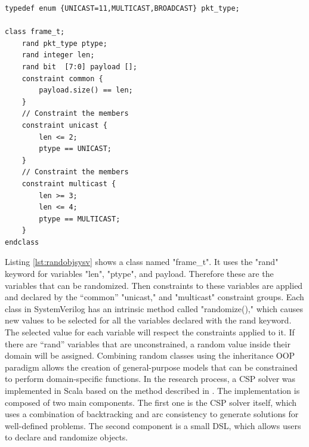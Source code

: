 \documentclass[conference]{IEEEtran}
\begin{document}
\begin{lstlisting}[caption={Random object in SystemVerilog}, label={lst:randobjsysv}]
typedef enum {UNICAST=11,MULTICAST,BROADCAST} pkt_type;

class frame_t;
    rand pkt_type ptype;
    rand integer len;
    rand bit  [7:0] payload [];
    constraint common {
        payload.size() == len;
    }
    // Constraint the members
    constraint unicast {
        len <= 2;
        ptype == UNICAST;
    }
    // Constraint the members
    constraint multicast {
        len >= 3;
        len <= 4;
        ptype == MULTICAST;
    }
endclass
\end{lstlisting}
Listing \ref{lst:randobjsysv} shows a class named "frame\_t". It uses the "rand" keyword for variables "len", "ptype", and payload.
Therefore these are the variables that can be randomized. Then constraints to these variables are applied and declared by the ``common'' "unicast,"
and "multicast" constraint groups. Each class in SystemVerilog has an intrinsic method called "randomize()," which causes new values to be selected
for all the variables declared with the rand keyword. The selected value for each variable will respect the constraints applied to it. If there are
``rand'' variables that are unconstrained, a random value inside their domain will be assigned. Combining random classes using the inheritance OOP
paradigm allows the creation of general-purpose models that can be constrained to perform domain-specific functions. In the research process, a
CSP solver was implemented in Scala based on the method described in \cite{russell2002artificial}. The implementation is composed of two main components.
The first one is the CSP solver itself, which uses a combination of backtracking and arc consistency to generate solutions for well-defined problems.
The second component is a small DSL, which allows users to declare and randomize objects.
\end{document}
